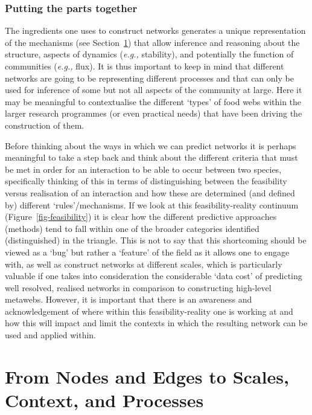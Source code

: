 \documentclass[
]{article}
\begin{document}
\subsubsection{Putting the parts
together}\label{putting-the-parts-together}

The ingredients one uses to construct networks generates a unique
representation of the mechanisms (see Section~\ref{sec-mechanisms}) that
allow inference and reasoning about the structure, aspects of dynamics
(\emph{e.g.,} stability), and potentially the function of communities
(\emph{e.g.,} flux). It is thus important to keep in mind that different
networks are going to be representing different processes and that can
only be used for inference of some but not all aspects of the community
at large. Here it may be meaningful to contextualise the different
`types' of food webs within the larger research programmes (or even
practical needs) that have been driving the construction of them.

Before thinking about the ways in which we can predict networks it is
perhaps meaningful to take a step back and think about the different
criteria that must be met in order for an interaction to be able to
occur between two species, specifically thinking of this in terms of
distinguishing between the feasibility versus realisation of an
interaction and how these are determined (and defined by) different
`rules'/mechanisms. If we look at this feasibility-reality continuum
(Figure~\ref{fig-feasibility}) it is clear how the different predictive
approaches (methods) tend to fall within one of the broader categories
identified (distinguished) in the triangle. This is not to say that this
shortcoming should be viewed as a `bug' but rather a `feature' of the
field as it allows one to engage with, as well as construct networks at
different scales, which is particularly valuable if one takes into
consideration the considerable `data cost' of predicting well resolved,
realised networks in comparison to constructing high-level metawebs.
However, it is important that there is an awareness and acknowledgement
of where within this feasibility-reality one is working at and how this
will impact and limit the contexts in which the resulting network can be
used and applied within.

\section{From Nodes and Edges to Scales, Context, and
Processes}\label{sec-mechanisms}
\end{document}
